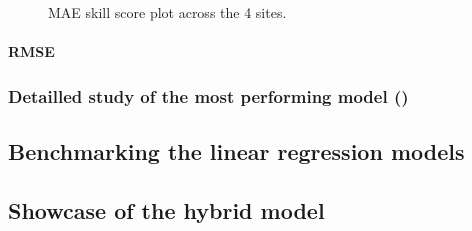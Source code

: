 \begin{figure}[htb!]
    \centering
    

    \caption{MAE skill score plot across the 4 sites.}
\end{figure}
\paragraph{RMSE}

\subsubsection{Detailled study of the most performing model ()}
\subsection{Benchmarking the linear regression models}
\subsection{Showcase of the hybrid model}